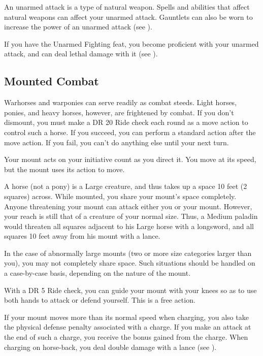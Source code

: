         An unarmed attack is a type of natural weapon.
        Spells and abilities that affect natural weapons can affect your unarmed attack.
        Gauntlets can also be worn to increase the power of an unarmed attack (see ).

        If you have the Unarmed Fighting feat, you become proficient with your unarmed attack, and can deal lethal damage with it (see ).

    \subsection{Mounted Combat}\label{Mounted Combat}
         Warhorses and warponies can serve readily as combat steeds. Light horses, ponies, and heavy horses, however, are frightened by combat. If you don't dismount, you must make a DR 20 Ride check each round as a move action to control such a horse. If you succeed, you can perform a standard action after the move action. If you fail, you can't do anything else until your next turn.

        Your mount acts on your initiative count as you direct it. You move at its speed, but the mount uses its action to move.

         A horse (not a pony) is a Large creature, and thus takes up a space 10 feet (2 squares) across. While mounted, you share your mount's space completely. Anyone threatening your mount can attack either you or your mount. However, your reach is still that of a creature of your normal size. Thus, a Medium paladin would threaten all squares adjacent to his Large horse with a longsword, and all squares 10 feet away from his mount with a lance.

        In the case of abnormally large mounts (two or more size categories larger than you), you may not completely share space. Such situations should be handled on a case-by-case basis, depending on the nature of the mount.

         With a DR 5 Ride check, you can guide your mount with your knees so as to use both hands to attack or defend yourself. This is a free action.

        If your mount moves more than its normal speed when charging, you also take the physical defense penalty associated with a charge. If you make an attack at the end of such a charge, you receive the bonus gained from the charge. When charging on horse-back, you deal double damage with a lance (see ).

